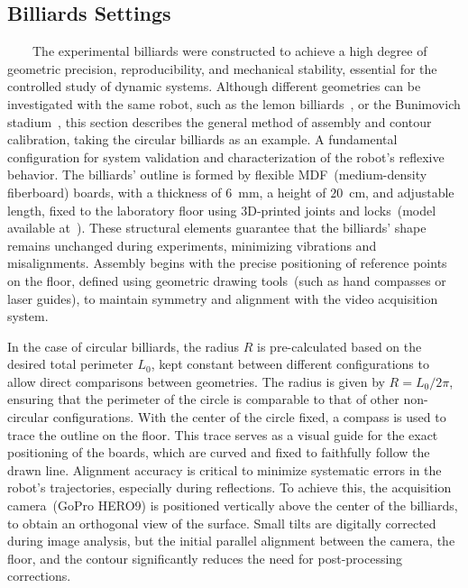 \documentclass[pdflatex,sn-mathphys-num,iicol]{sn-jnl}%
\theoremstyle{thmstyleone}%
\theoremstyle{thmstyletwo}%
\theoremstyle{thmstylethree}%
\begin{document}
\subsection{\label{sec:bil_set} Billiards Settings}

\ \ \ \ The experimental billiards were constructed to achieve a high degree of geometric precision, reproducibility, and mechanical stability, essential for the controlled study of dynamic systems. Although different geometries can be investigated with the same robot, such as the lemon billiards~\cite{qui:2025}, or the Bunimovich stadium~\cite{vas:2022}, this section describes the general method of assembly and contour calibration, taking the circular billiards as an example. A fundamental configuration for system validation and characterization of the robot's reflexive behavior. The billiards' outline is formed by flexible MDF~(medium-density fiberboard) boards, with a thickness of $6$~mm, a height of $20$~cm, and adjustable length, fixed to the laboratory floor using 3D-printed joints and locks~(model available at~\cite{qui:2026rep}). These structural elements guarantee that the billiards' shape remains unchanged during experiments, minimizing vibrations and misalignments. Assembly begins with the precise positioning of reference points on the floor, defined using geometric drawing tools~(such as hand compasses or laser guides), to maintain symmetry and alignment with the video acquisition system.

In the case of circular billiards, the radius $R$ is pre-calculated based on the desired total perimeter $L_0$, kept constant between different configurations to allow direct comparisons between geometries. The radius is given by $R = L_0 / 2\pi$, ensuring that the perimeter of the circle is comparable to that of other non-circular configurations. With the center of the circle fixed, a compass is used to trace the outline on the floor. This trace serves as a visual guide for the exact positioning of the boards, which are curved and fixed to faithfully follow the drawn line. Alignment accuracy is critical to minimize systematic errors in the robot's trajectories, especially during reflections. To achieve this, the acquisition camera~(GoPro HERO9) is positioned vertically above the center of the billiards, to obtain an orthogonal view of the surface. Small tilts are digitally corrected during image analysis, but the initial parallel alignment between the camera, the floor, and the contour significantly reduces the need for post-processing corrections.
\end{document}
